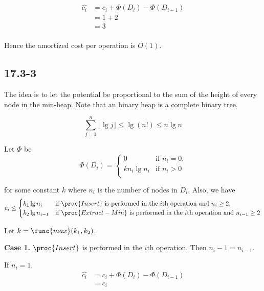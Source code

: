 \begin{equation*}
\begin{split}
    \hat{c_i} & = c_i + \Phi(D_i) - \Phi(D_{i - 1}) \\
    & = 1 + 2 \\
    & = 3 \\
\end{split}
\end{equation*}

Hence the amortized cost per operation is $O(1)$.

\subsection*{17.3-3}

The idea is to let the potential be proportional to 
the sum of the height of every node in the min-heap.
Note that an binary heap is a complete binary tree.

\begin{equation*}
    \sum\limits_{j=1}^n \lfloor \lg j \rfloor
    \leq \lg (n!) \leq n \lg n
\end{equation*}

Let $\Phi$ be 
\begin{equation*}
    \Phi(D_i) = 
    \begin{cases}
        0 & \text{if $n_i = 0$,} \\
        k n_i \lg n_i & \text{if $n_i > 0$} \\
    \end{cases}
\end{equation*}

for some constant $k$
where $n_i$ is the number of nodes in $D_i$.
Also, we have
\begin{equation*}
    c_i \leq 
    \begin{cases}
        k_1 \lg n_i & \text{if $\proc{Insert}$ is performed in the $i$th operation 
            and $n_i \geq 2$,} \\
        k_2 \lg n_{i-1} & \text{if $\proc{Extract-Min}$ is performed in the $i$th operation 
            and $n_{i-1} \geq 2$} \\
    \end{cases}
\end{equation*}

Let $k = \func{max}(k_1,k_2)$.

\textbf{Case 1.}
$\proc{Insert}$ is performed in the $i$th operation.
Then $n_i - 1 = n_{i-1}$.

If $n_i = 1$,
\begin{equation*}
\begin{split}
    \hat{c_i} & = c_i + \Phi(D_i) - \Phi(D_{i - 1}) \\
    & = c_i \\
\end{split}
\end{equation*}


